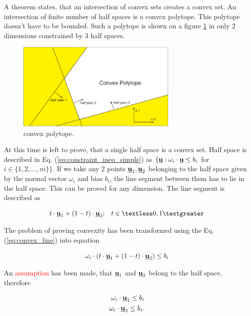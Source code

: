 \documentclass[a4paper,11pt,titlepage]{article}
\newcommand{\uvec}{\textbf{\underline{u}}}
\begin{document}
A theorem states, that an intersection of convex sets creates a convex set. An intersection of finite number of half spaces is a convex polytope. This polytope doesn't have to be bounded. Such a polytope is shown on a figure \ref{fig:convex_polytope} in only 2 dimensions constrained by 3 half spaces.

\begin{figure}[h]
\centering
\includegraphics[width=0.7\textwidth]{fig/convex_polytope.eps} 
\caption{convex polytope.}
\label{fig:convex_polytope}
\end{figure}

At this time is left to prove, that a single half space is a convex set. Half space is described in Eq. (\ref{eq:constraint_ineq_simple}) as $\{\uvec : \omega_i \cdot \uvec \leq b_i$ for $i \in \{1, 2, ..., m\}\}$. If we take any 2 points $\uvec_1, \uvec_2$ belonging to the half space given by the normal vector $\omega_i$ and bias $b_i$, the line segment between them has to lie in the half space. This can be proved for any dimension. The line segment is described as

\begin{equation}
\label{eq:convex_line}
t \cdot \uvec_1 + (1-t) \cdot \uvec_2; \;\;\; t \in \textless 0, 1 \textgreater
\end{equation}

The problem of proving convexity has been transformed using the Eq. (\ref{eq:convex_line}) into equation 

\begin{equation}
\label{eq:convex_u_proof}
\omega_i \cdot (t \cdot \uvec_1 + (1-t) \cdot \uvec_2) \leq b_i
\end{equation}


An \textcolor{red}{assumption} has been made, that $\uvec_1$ and $\uvec_2$ belong to the half space, therefore 

\begin{equation}
\begin{split}
\omega_i \cdot \uvec_1 \leq b_i\\
\omega_i \cdot \uvec_2 \leq b_i.
\end{split}
\end{equation}
\end{document}
